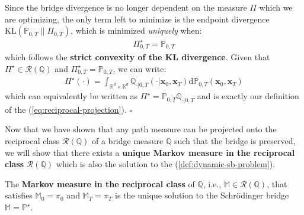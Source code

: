 \documentclass{article}
\begin{document}
Since the bridge divergence is no longer dependent on the measure $\Pi$ which we are optimizing, the only term left to minimize is the endpoint divergence $\text{KL}(\mathbb{P}_{0,T}\|\Pi_{0,T})$, which is minimized \textit{uniquely} when:
\begin{align}
    \Pi^\star_{0,T}=\mathbb{P}_{0,T}
\end{align}
which follows the \textbf{strict convexity of the KL divergence}. Given that $\Pi^\star\in \mathcal{R}(\mathbb{Q})$ and $\Pi^\star_{0,T}=\mathbb{P}_{0,T}$, we can write:
\begin{align}
    \Pi^\star(\cdot)=\int_{\mathbb{R}^d\times \mathbb{R}^d}\mathbb{Q}_{\cdot|0,T}(\cdot|\boldsymbol{x}_0, \boldsymbol{x}_T)\mathrm{d}\mathbb{P}_{0,T}(\boldsymbol{x}_0, \boldsymbol{x}_T)
\end{align}
which can equivalently be written as $\Pi^\star=\mathbb{P}_{0,T}\mathbb{Q}_{\cdot|0,T}$ and is exactly our definition of the (\ref{eq:reciprocal-projection}). \hfill $\square$

Now that we have shown that any path measure can be projected onto the reciprocal class $\mathcal{R}(\mathbb{Q})$ of a bridge measure $\mathbb{Q}$ such that the bridge is preserved, we will show that there exists a \textbf{unique Markov measure in the reciprocal class} $\mathcal{R}(\mathbb{Q})$ which is also the solution to the (\ref{def:dynamic-sb-problem}). 

\begin{proposition}
The \textbf{Markov measure in the reciprocal class} of $\mathbb{Q}$, i.e., $\mathbb{M}\in \mathcal{R}(\mathbb{Q})$, that satisfies $\mathbb{M}_0=\pi_0$ and $\mathbb{M}_T=\pi_T$ is the unique solution to the Schrödinger bridge $\mathbb{M}=\mathbb{P}^\star$.
\end{proposition}
\end{document}

